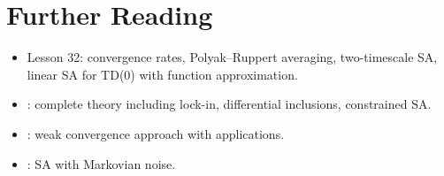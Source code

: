 \documentclass[11pt,a4paper]{article}
\begin{document}

\section{Further Reading}
\label{sec:further-reading}

\begin{itemize}[leftmargin=2em]
  \item Lesson 32: convergence rates, Polyak--Ruppert averaging,
    two-timescale SA, linear SA for TD(0) with function approximation.
  \item \citet{borkar2008}: complete theory including lock-in,
    differential inclusions, constrained SA.
  \item \citet{kushner2003}: weak convergence approach with
    applications.
  \item \citet{benveniste2012}: SA with Markovian noise.
\end{itemize}


\end{document}
